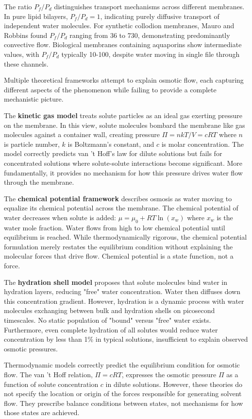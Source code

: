 The ratio $P_f/P_d$ distinguishes transport mechanisms across different membranes. In pure lipid bilayers, $P_f/P_d = 1$, indicating purely diffusive transport of independent water molecules. For synthetic collodion membranes, Mauro and Robbins found $P_f/P_d$ ranging from 36 to 730, demonstrating predominantly convective flow. Biological membranes containing aquaporins show intermediate values, with $P_f/P_d$ typically 10-100, despite water moving in single file through these channels.

Multiple theoretical frameworks attempt to explain osmotic flow, each capturing different aspects of the phenomenon while failing to provide a complete mechanistic picture.

The \textbf{kinetic gas model} treats solute particles as an ideal gas exerting pressure on the membrane. In this view, solute molecules bombard the membrane like gas molecules against a container wall, creating pressure $\Pi = nkT/V = cRT$ where $n$ is particle number, $k$ is Boltzmann's constant, and $c$ is molar concentration. The model correctly predicts van 't Hoff's law for dilute solutions but fails for concentrated solutions where solute-solute interactions become significant. More fundamentally, it provides no mechanism for how this pressure drives water flow through the membrane.

The \textbf{chemical potential framework} describes osmosis as water moving to equalize its chemical potential across the membrane. The chemical potential of water decreases when solute is added: $\mu = \mu_0 + RT \ln(x_w)$ where $x_w$ is the water mole fraction. Water flows from high to low chemical potential until equilibrium is reached. While thermodynamically rigorous, the chemical potential formulation merely restates the equilibrium condition without explaining the molecular forces that drive flow. Chemical potential is a state function, not a force.

The \textbf{hydration shell model} proposes that solute molecules bind water in hydration layers, reducing "free" water concentration. Water then diffuses down this concentration gradient. However, hydration is a dynamic process with water molecules exchanging between bulk and hydration shells on picosecond timescales. No static population of "bound" versus "free" water exists. Furthermore, even complete hydration of all solutes would reduce water concentration by less than 1\% in typical solutions, insufficient to explain observed osmotic pressures.

Thermodynamic models correctly predict the equilibrium condition for osmotic flow. The van 't Hoff relation, $\Pi = cRT$, expresses the osmotic pressure $\Pi$ as a function of solute concentration $c$ in dilute solutions. However, these theories do not specify the location or origin of the forces responsible for generating solvent flow. They prescribe balance conditions between states, not mechanisms for how those states are achieved.

